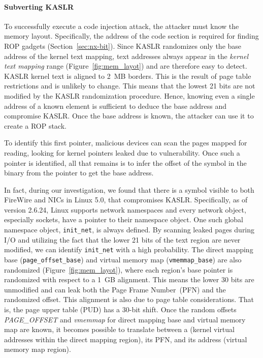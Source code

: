 
\paragraph{Subverting KASLR}
To successfully execute a code injection attack, the attacker must know the memory layout. Specifically, the address of the code section is required for finding ROP gadgets (Section~\ref{sec:nx-bit}). 
Since KASLR randomizes only the base address of the kernel text mapping, text addresses always appear in the \textit{kernel text mapping} range (Figure~\ref{fig:mem_layot}) and are therefore easy to detect. KASLR kernel text is aligned to 2~MB borders. This is the result of page table restrictions and is unlikely to change. This means that the lowest 21 bits are not modified by the KASLR randomization procedure. Hence, knowing even a single address of a known element is sufficient to deduce the base address and compromise KASLR. Once the base address is known, the attacker can use it to create a ROP stack.

To identify this first pointer, malicious devices can scan the pages mapped for reading, looking for kernel pointers leaked due to \subpage{} vulnerability. Once such a pointer is identified, all that remains is to infer the offset of the symbol in the binary from the pointer to get the base address.%

In fact, during our investigation, we found that there is a symbol visible to both FireWire and NICs in Linux 5.0, that compromises  KASLR. Specifically, as of version 2.6.24, Linux supports network namespaces and every network object, especially sockets, have a pointer to their namespace object. One such global namespace object, \texttt{init\_net}, is always defined. By scanning leaked pages during I/O and utilizing the fact that the lower 21 bits of the text region are never modified, we can identify \texttt{init\_net} with a high probability.
The direct mapping base (\texttt{page\_offset\_base}) and virtual memory map (\texttt{vmemmap\_base}) are also randomized (Figure~\ref{fig:mem_layot}), where each region's base pointer is randomized with respect to a 1~GB alignment. This means the lower 30 bits are unmodified and can leak both the Page Frame Number~(PFN) and the randomized offset. This alignment is also due to page table considerations. That is, the page upper table (PUD) has a 30-bit shift. Once the random offsets \textit{PAGE\_OFFSET} and \textit{vmemmap} for direct mapping base and virtual memory map are known, it becomes possible to translate between a \kva{} (kernel virtual addresses within the direct mapping region), its PFN, and its \page{} address (virtual memory map region).

